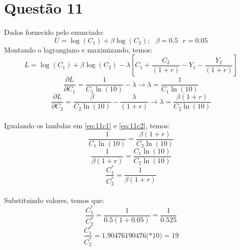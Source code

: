 \documentclass{article}
\begin{document}
\section*{Questão 11}
Dados fornecido pelo enunciado:
$$U=\log(C_1)+\beta\log(C_2);\>\>\>
\beta=0.5\>\>\> r=0.05$$
Montando o lagrangiano e maximizando, temos:
\begin{equation}
    L=\log(C_1)+\beta\log(C_2)-\lambda\left[C_1+\frac{C_2}{(1+r)}-Y_1-\frac{Y_2}{(1+r)}\right]
\end{equation}
\begin{equation}\label{eq:11c1}
    \frac{\partial L}{\partial C_1}=\frac{1}{C_1\ln(10)}-\lambda \to \lambda=\frac{1}{C_1\ln(10)}
\end{equation}
\begin{equation}\label{eq:11c2}
    \frac{\partial L}{\partial C_2}=\frac{\beta}{C_2\ln(10)}-\frac{\lambda}{(1+r)} \to \lambda=\frac{\beta(1+r)}{C_2\ln(10)}
\end{equation}
\\
Igualando os lambdas em \eqref{eq:11c1} e \eqref{eq:11c2}, temos:
\begin{equation}
    \frac{1}{C_1\ln(10)} = \frac{\beta(1+r)}{C_2\ln(10)}
\end{equation}
\begin{equation}
    \frac{1}{\beta(1+r)} = \frac{C_1\ln(10)}{C_2\ln(10)}
\end{equation}
\begin{equation}\label{eq:11eqlambda}
    \frac{C_1^*}{C_2^*}=\frac{1}{\beta(1+r)}
\end{equation}
\\
Substituindo valores, temos que:
\begin{equation}
    \frac{C_1^*}{C_2^*}=\frac{1}{0.5(1+0.05)} = \frac{1}{0.525}
\end{equation}
\begin{equation}
    \frac{C_1^*}{C_2^*}= 1.90476190476 \textit{(*10)} = 19 
\end{equation}
\clearpage
\end{document}

